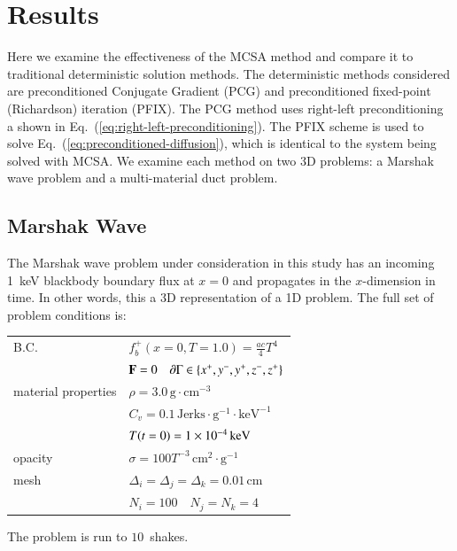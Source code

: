 \documentclass[preprint,12pt]{elsarticle}
\newcommand{\Cv}{\ensuremath{C_{v}}}
\newcommand{\Di}{\ensuremath{\Delta_i}}
\newcommand{\Dj}{\ensuremath{\Delta_j}}
\newcommand{\Dk}{\ensuremath{\Delta_k}}
\begin{document}
\section{Results}
\label{sec:results}

Here we examine the effectiveness of the MCSA method and compare it to
traditional deterministic solution methods.  The deterministic methods
considered are preconditioned Conjugate Gradient (PCG) and
preconditioned fixed-point (Richardson) iteration (PFIX).  The PCG
method uses right-left preconditioning a shown in
Eq.~(\ref{eq:right-left-preconditioning}).  The PFIX scheme is used to
solve Eq.~(\ref{eq:preconditioned-diffusion}), which is identical to
the system being solved with MCSA.  We examine each method on two 3D
problems: a Marshak wave problem and a multi-material duct problem.

\subsection{Marshak Wave}

The Marshak wave problem under consideration in this study has an
incoming 1~keV blackbody boundary flux at $x=0$ and propagates in the
$x$-dimension in time.  In other words, this a 3D representation of a
1D problem.  The full set of problem conditions is:

\begin{center}
  \begin{tabular}{ll}\hline
    B.C. & $f_b^{+}(x=0,T=1.0) = \frac{ac}{4}T^4$ \\
    & $\mathbf{F} = 0\quad \partial\Gamma \in \{x^{+}, y^{-}, y^{+},
    z^{-}, z^{+}\}$ \\
    material properties & $\rho = 3.0\,\text{g}\cdot\text{cm}^{-3}$ \\
    & $\Cv = 0.1\,\text{Jerks}\cdot\text{g}^{-1}\cdot\text{keV}^{-1}$\\
    & $T(t=0) = 1\times 10^{-4}\,\text{keV}$\\
    opacity & $\sigma = 100T^{-3}\,\text{cm}^2\cdot\text{g}^{-1}$ \\
    mesh & $\Di = \Dj = \Dk = 0.01\,\text{cm}$ \\
    & $N_i = 100\quad N_j = N_k = 4$ \\
    \hline
  \end{tabular}
\end{center}

The problem is run to $10$~shakes.
\end{document}
